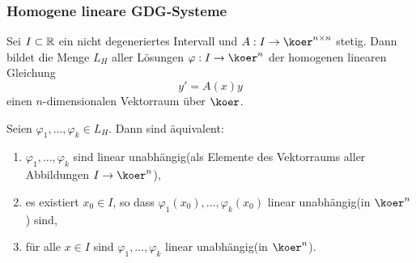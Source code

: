 \subsubsection{Homogene lineare GDG-Systeme}
\begin{thm}
 Sei $I \subset \mathbb{R}$ ein nicht degeneriertes Intervall und $A:I \to \koer^{n \times n}$ stetig. Dann bildet die Menge $L_H$ aller Lösungen $\varphi:I \to \koer^n$ der homogenen linearen Gleichung 
 \[ y' = A(x) y \]
 einen $n$-dimensionalen Vektorraum über $\koer$.
 
 Seien $\varphi_1, \ldots, \varphi_k \in L_H$. Dann sind äquivalent:
 \begin{enumerate}
  \item $\varphi_1, \ldots, \varphi_k$ sind linear unabhängig\footnotemark (als Elemente des Vektorraums aller Abbildungen $I \to \koer^n$),
  \item es existiert $x_0 \in I$, so dass $\varphi_1(x_0), \ldots, \varphi_k(x_0)$ linear unabhängig\footnotemark (in $\koer^n$) sind,
  \item für alle $x \in I$ sind $\varphi_1, \ldots, \varphi_k$ linear unabhängig\footnotemark (in $\koer^n$). 
 \end{enumerate}

\end{thm}
\addtocounter{footnote}{-2}
\addtocounter{footnote}{1}
\addtocounter{footnote}{1}
 
